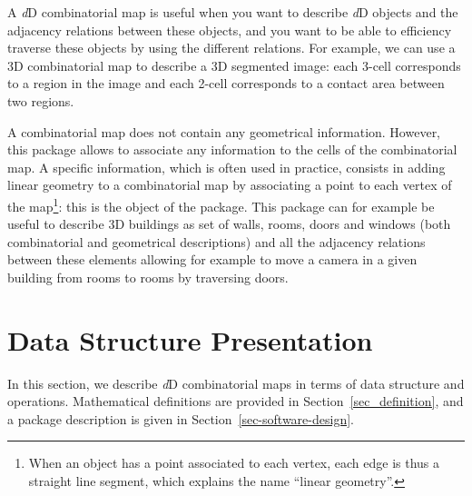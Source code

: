 A \emph{d}D combinatorial map is useful when you want to describe \emph{d}D
objects and the adjacency relations between these objects, and you
want to be able to efficiency traverse these objects by using the
different relations.  For example, we can use a 3D combinatorial map
to describe a 3D segmented image: each 3-cell corresponds to a region
in the image and each 2-cell corresponds to a contact area between two
regions.

A combinatorial map does not contain any geometrical
information. However, this package allows to associate any information
to the cells of the combinatorial map. A specific information, which
is often used in practice, consists in adding linear geometry to a
combinatorial map by associating a point to each vertex of the
map\footnote{When an object has a point associated to each vertex,
  each edge is thus a straight line segment, which explains the name
  ``linear geometry''.}: this is the object of the
 package. This package can for example be
useful to describe 3D buildings as set of walls, rooms, doors and
windows (both combinatorial and geometrical descriptions) and all the
adjacency relations between these elements allowing for example to
move a camera in a given building from rooms to rooms by traversing
doors.


\section{Data Structure Presentation}\label{sec_presentation}
In this section, we describe \emph{d}D combinatorial maps in terms of data
structure and operations. Mathematical definitions are provided in
Section~\ref{sec_definition}, and a package description is given in
Section~\ref{sec-software-design}.

